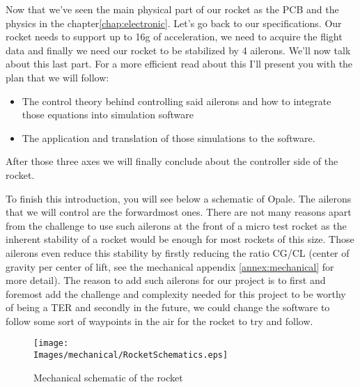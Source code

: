 Now that we've seen the main physical part of our rocket as the PCB and the
physics in the chapter\ref{chap:electronic}. Let's go back to our
specifications. Our rocket needs to support up to 16g of acceleration, we need
to acquire the flight data and finally we need our rocket to be stabilized by 4
ailerons. We'll now talk about this last part. For a more efficient read about
this I'll present you with the plan that we will follow:

\begin{itemize}
    \item The control theory behind controlling said ailerons and how to integrate those
          equations into simulation software
    \item The application and translation of those simulations to the software.
\end{itemize}

After those three axes we will finally conclude about the controller side of
the rocket.

To finish this introduction, you will see below a schematic of Opale. The
ailerons that we will control are the forwardmost ones. There are not many
reasons apart from the challenge to use such ailerons at the front of a micro
test rocket as the inherent stability of a rocket would be enough for most
rockets of this size. Those ailerons even reduce this stability by firstly
reducing the ratio CG/CL (center of gravity per center of lift, see the
mechanical appendix \ref{annex:mechanical} for more detail). The reason to add
such ailerons for our project is to first and foremost add the challenge and
complexity needed for this project to be worthy of being a TER and secondly in
the future, we could change the software to follow some sort of waypoints in
the air for the rocket to try and follow.

\begin{figure}[!hbt]
    \centering
    \texttt{[image: \\Images/mechanical/RocketSchematics.eps]}
    \caption{Mechanical schematic of the rocket}
\end{figure}
\FloatBarrier





